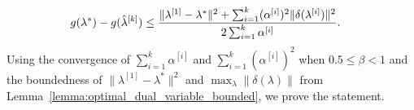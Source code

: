 \documentclass[journal]{IEEEtran}
\begin{document}
\begin{equation}
  \begin{aligned}
    &g(\lambda^*) - g(\hat{\lambda}^{[k]}) \leq \frac{\|\lambda^{[1]} - \lambda^*\|^2+\sum_{i=1}^{k}(\alpha^{[i]})^2 \|\delta(\lambda^{[i]})\|^2}{2\sum_{i=1}^{k}\alpha^{[i]}}.
  \end{aligned}
  \notag
\end{equation}
Using the convergence of $\sum_{i=1}^{k}\alpha^{[i]}$ and $\sum_{i=1}^{k}(\alpha^{[i]})^2$ when $0.5\leq \beta < 1$ \cite{boyd2003subgradient} and the boundedness of $\|\lambda^{[1]} - \lambda^*\|^2$ and $\max_\lambda \|\delta(\lambda)\| $ from Lemma~\ref{lemma:optimal_dual_variable_bounded}, we prove the statement.
\end{document}
